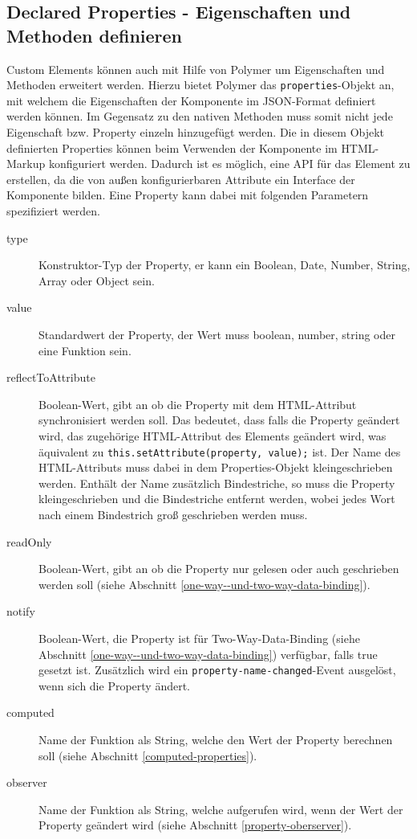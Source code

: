 \subsection{Declared Properties - Eigenschaften und Methoden definieren}\label{declared-properties---eigenschaften-und-methoden-definieren}

Custom Elements können auch mit Hilfe von Polymer um Eigenschaften und Methoden erweitert werden. Hierzu bietet Polymer das \texttt{properties}-Objekt an, mit welchem die Eigenschaften der Komponente im JSON-Format definiert werden können. Im Gegensatz zu den nativen Methoden muss somit nicht jede Eigenschaft bzw. Property einzeln hinzugefügt werden. Die in diesem Objekt definierten Properties können beim Verwenden der Komponente im \ac{HTML}-Markup konfiguriert werden. Dadurch ist es möglich, eine \ac{API} für das Element zu erstellen, da die von außen konfigurierbaren Attribute ein Interface der Komponente bilden. Eine Property kann dabei mit folgenden Parametern spezifiziert werden.

\begin{description}
  \item[type] Konstruktor-Typ der Property, er kann ein Boolean, Date, Number, String, Array oder Object sein.
  \item[value] Standardwert der Property, der Wert muss boolean, number, string oder eine Funktion sein.
  \item[reflectToAttribute] Boolean-Wert, gibt an ob die Property mit dem \ac{HTML}-Attribut synchronisiert werden soll. Das bedeutet, dass falls die Property geändert wird, das zugehörige \ac{HTML}-Attribut des Elements geändert wird, was äquivalent zu \texttt{this.setAttribute(property,\ value);} ist. Der Name des \ac{HTML}-Attributs muss dabei in dem Properties-Objekt kleingeschrieben werden. Enthält der Name zusätzlich Bindestriche, so muss die Property kleingeschrieben und die Bindestriche entfernt werden, wobei jedes Wort nach einem Bindestrich groß geschrieben werden muss.
  \item[readOnly] Boolean-Wert, gibt an ob die Property nur gelesen oder auch geschrieben werden soll (siehe Abschnitt \ref{one-way--und-two-way-data-binding}).
  \item[notify] Boolean-Wert, die Property ist für Two-Way-Data-Binding (siehe Abschnitt \ref{one-way--und-two-way-data-binding}) verfügbar, falls true gesetzt ist. Zusätzlich wird ein \texttt{property-name-changed}-Event ausgelöst, wenn sich die Property ändert.
  \item[computed] Name der Funktion als String, welche den Wert der Property berechnen soll (siehe Abschnitt \ref{computed-properties}).
  \item[observer] Name der Funktion als String, welche aufgerufen wird, wenn der Wert der Property geändert wird (siehe Abschnitt \ref{property-oberserver}).
\end{description}

